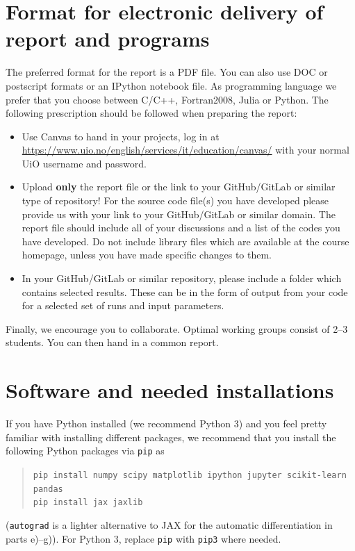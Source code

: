 \documentclass[11pt,a4paper]{article}
\begin{document}
\section*{Format for electronic delivery of report and programs}

The preferred format for the report is a PDF file.  You can also use DOC or
postscript formats or an IPython notebook file.  As programming language we
prefer that you choose between C/C++, Fortran2008, Julia or Python.  The
following prescription should be followed when preparing the report:
\begin{itemize}[nosep]
  \item Use Canvas to hand in your projects, log in at
        \url{https://www.uio.no/english/services/it/education/canvas/} with
        your normal UiO username and password.
  \item Upload \textbf{only} the report file or the link to your GitHub/GitLab
        or similar type of repository!  For the source code file(s) you have
        developed please provide us with your link to your GitHub/GitLab or
        similar domain.  The report file should include all of your
        discussions and a list of the codes you have developed.  Do not
        include library files which are available at the course homepage,
        unless you have made specific changes to them.
  \item In your GitHub/GitLab or similar repository, please include a folder
        which contains selected results.  These can be in the form of output
        from your code for a selected set of runs and input parameters.
\end{itemize}
Finally, we encourage you to collaborate.  Optimal working groups consist of
2--3 students.  You can then hand in a common report.

\section*{Software and needed installations}

If you have Python installed (we recommend Python 3) and you feel pretty
familiar with installing different packages, we recommend that you install
the following Python packages via \texttt{pip} as
\begin{quote}\small
\texttt{pip install numpy scipy matplotlib ipython jupyter scikit-learn pandas}\\
\texttt{pip install jax jaxlib}
\end{quote}
(\texttt{autograd} is a lighter alternative to JAX for the automatic
differentiation in parts e)--g)).  For Python 3, replace \texttt{pip} with
\texttt{pip3} where needed.
\end{document}
